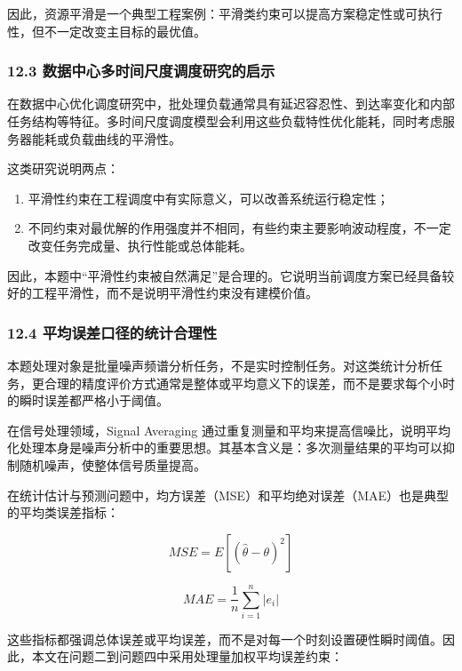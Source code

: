 \documentclass[
]{article}
\begin{document}
因此，资源平滑是一个典型工程案例：平滑类约束可以提高方案稳定性或可执行性，但不一定改变主目标的最优值。

\subsubsection{12.3
数据中心多时间尺度调度研究的启示}\label{123-ux6570ux636eux4e2dux5fc3ux591aux65f6ux95f4ux5c3aux5ea6ux8c03ux5ea6ux7814ux7a76ux7684ux542fux793a}

在数据中心优化调度研究中，批处理负载通常具有延迟容忍性、到达率变化和内部任务结构等特征。多时间尺度调度模型会利用这些负载特性优化能耗，同时考虑服务器能耗或负载曲线的平滑性。

这类研究说明两点：

\begin{enumerate}
\def\labelenumi{\arabic{enumi}.}
\item
  平滑性约束在工程调度中有实际意义，可以改善系统运行稳定性；
\item
  不同约束对最优解的作用强度并不相同，有些约束主要影响波动程度，不一定改变任务完成量、执行性能或总体能耗。
\end{enumerate}

因此，本题中``平滑性约束被自然满足''是合理的。它说明当前调度方案已经具备较好的工程平滑性，而不是说明平滑性约束没有建模价值。

\subsubsection{12.4
平均误差口径的统计合理性}\label{124-ux5e73ux5747ux8befux5deeux53e3ux5f84ux7684ux7edfux8ba1ux5408ux7406ux6027}

本题处理对象是批量噪声频谱分析任务，不是实时控制任务。对这类统计分析任务，更合理的精度评价方式通常是整体或平均意义下的误差，而不是要求每个小时的瞬时误差都严格小于阈值。

在信号处理领域，Signal Averaging
通过重复测量和平均来提高信噪比，说明平均化处理本身是噪声分析中的重要思想。其基本含义是：多次测量结果的平均可以抑制随机噪声，使整体信号质量提高。

在统计估计与预测问题中，均方误差（MSE）和平均绝对误差（MAE）也是典型的平均类误差指标：

\[MSE=E[(\hat{\theta}-\theta)^2]\]

\[MAE=\frac{1}{n}\sum_{i=1}^{n}|e_i|\]

这些指标都强调总体误差或平均误差，而不是对每一个时刻设置硬性瞬时阈值。因此，本文在问题二到问题四中采用处理量加权平均误差约束：
\end{document}
